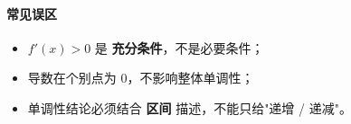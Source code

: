 \paragraph{常见误区}

\begin{itemize}
  \item $f'(x)>0$ 是 \textbf{充分条件}，不是必要条件；
  \item 导数在个别点为 0，不影响整体单调性；
  \item 单调性结论必须结合 \textbf{区间} 描述，不能只给"递增 / 递减"。
\end{itemize}
